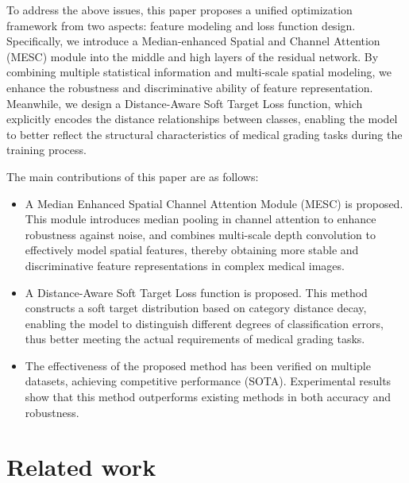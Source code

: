 \documentclass[letterpaper, 10 pt, conference]{ieeeconf}  %
\begin{document}
To address the above issues, this paper proposes a unified optimization framework from two aspects: feature modeling and loss function design. Specifically, we introduce a Median-enhanced Spatial and Channel Attention (MESC) module into the middle and high layers of the residual network. By combining multiple statistical information and multi-scale spatial modeling, we enhance the robustness and discriminative ability of feature representation. Meanwhile, we design a Distance-Aware Soft Target Loss function, which explicitly encodes the distance relationships between classes, enabling the model to better reflect the structural characteristics of medical grading tasks during the training process.

The main contributions of this paper are as follows:
\begin{itemize}
    \item A Median Enhanced Spatial Channel Attention Module (MESC) is proposed. This module introduces median pooling in channel attention to enhance robustness against noise, and combines multi-scale depth convolution to effectively model spatial features, thereby obtaining more stable and discriminative feature representations in complex medical images.

    \item A Distance-Aware Soft Target Loss function is proposed. This method constructs a soft target distribution based on category distance decay, enabling the model to distinguish different degrees of classification errors, thus better meeting the actual requirements of medical grading tasks.

    \item The effectiveness of the proposed method has been verified on multiple datasets, achieving competitive performance (SOTA). Experimental results show that this method outperforms existing methods in both accuracy and robustness.
\end{itemize}

\section{Related work}
\end{document}
